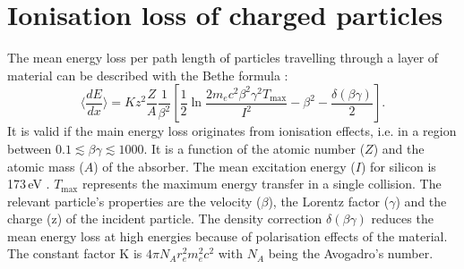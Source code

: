 \section{Ionisation loss of charged particles}
\label{sec:sub:MeasuringDeDx}
The mean energy loss per path length of particles travelling through a layer of material can be described with the Bethe formula \cite{bib:Bethe_1930}:
\begin{equation*}
\langle \frac{dE}{dx} \rangle = Kz^2\frac{Z}{A}\frac{1}{\beta^2} [ \frac{1}{2} \ln{\frac{2m_e c^2 \beta^2 \gamma^2 T_{\text{max}}}{I^2}} - \beta^2 - \frac{\delta( \beta \gamma )}{2} ].
\end{equation*}
It is valid if the main energy loss originates from ionisation effects, i.e. in a region between $0.1\lesssim\beta\gamma\lesssim 1000$.
It is a function of the atomic number ($Z$) and the atomic mass ($A$) of the absorber. 
The mean excitation energy ($I$) for silicon is 173\,eV \cite{bib:NIST}. 
$T_{\text{max}}$ represents the maximum energy transfer in a single collision.
The relevant particle's properties are the velocity ($\beta$), the Lorentz factor ($\gamma$) and the charge (z) of the incident particle.
The density correction $\delta( \beta \gamma )$ reduces the mean energy loss at high energies because of polarisation effects of the material. 
The constant factor K is $4\pi N_A r_e^2 m_e^2 c^2$ with $N_A$ being the Avogadro’s number.

